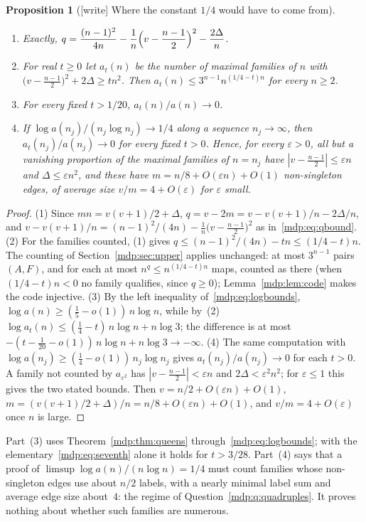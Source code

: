 \documentclass[11pt,letterpaper]{article}
\numberwithin{equation}{section}
\newtheorem{proposition}[theorem]{Proposition}
\theoremstyle{remark}\newtheorem{remark}[theorem]{Remark}
\begin{document}
\begin{proposition}[{[write]} Where the constant $1/4$ would have to come from]\label{mdp:prop:typical}
\begin{enumerate}
\item[(1)] Exactly,
 $q=\dfrac{(n-1)^2}{4n}-\dfrac1n\Bigl(v-\dfrac{n-1}2\Bigr)^2-\dfrac{2\Delta}n$.
\item[(2)] For real $t\ge0$ let $a_t(n)$ be the number of maximal families of
 $n$ with $\bigl(v-\tfrac{n-1}2\bigr)^2+2\Delta\ge tn^2$. Then
 $a_t(n)\le3^{n-1}n^{(1/4-t)n}$ for every $n\ge2$.
\item[(3)] For every fixed $t>1/20$, $a_t(n)/a(n)\to0$.
\item[(4)] If $\log a(n_j)/(n_j\log n_j)\to1/4$ along a sequence
 $n_j\to\infty$, then $a_t(n_j)/a(n_j)\to0$ for every fixed $t>0$. Hence,
 for every $\varepsilon>0$, all but a vanishing proportion of the maximal
 families of $n=n_j$ have $|v-\frac{n-1}2|\le\varepsilon n$ and
 $\Delta\le\varepsilon n^2$, and these have
 $m=n/8+O(\varepsilon n)+O(1)$ non-singleton edges, of average size
 $v/m=4+O(\varepsilon)$ for $\varepsilon$ small.
\end{enumerate}
\end{proposition}
\begin{proof}
(1) Since $mn=v(v+1)/2+\Delta$, $q=v-2m=v-v(v+1)/n-2\Delta/n$, and
$v-v(v+1)/n=(n-1)^2/(4n)-\frac1n\bigl(v-\frac{n-1}2\bigr)^2$ as
in~\eqref{mdp:eq:qbound}. (2) For the families counted, (1) gives
$q\le(n-1)^2/(4n)-tn\le(1/4-t)n$. The counting of Section~\ref{mdp:sec:upper}
applies unchanged: at most $3^{n-1}$ pairs $(A,F)$, and for each at most
$n^q\le n^{(1/4-t)n}$ maps, counted as there (when $(1/4-t)n<0$ no family qualifies,
since $q\ge0$); Lemma~\ref{mdp:lem:code} makes the code injective. (3) By
the left inequality of~\eqref{mdp:eq:logbounds},
$\log a(n)\ge(\tfrac15-o(1))\,n\log n$, while by~(2)
$\log a_t(n)\le(\tfrac14-t)\,n\log n+n\log3$; the difference is at most
$-(t-\tfrac1{20}-o(1))\,n\log n+n\log3\to-\infty$. (4) The same computation
with $\log a(n_j)\ge(\tfrac14-o(1))\,n_j\log n_j$ gives $a_t(n_j)/a(n_j)\to0$
for each $t>0$. A family not counted by $a_{\varepsilon^2}$ has
$|v-\frac{n-1}2|<\varepsilon n$ and $2\Delta<\varepsilon^2n^2$; for $\varepsilon\le1$
this gives the two stated bounds. Then $v=n/2+O(\varepsilon n)+O(1)$,
$m=(v(v+1)/2+\Delta)/n=n/8+O(\varepsilon n)+O(1)$, and $v/m=4+O(\varepsilon)$
once $n$ is large.
\end{proof}
Part~(3) uses Theorem~\ref{mdp:thm:queens} through~\eqref{mdp:eq:logbounds};
with the elementary~\eqref{mdp:eq:seventh} alone it holds for $t>3/28$.
Part~(4) says that a proof of $\limsup\log a(n)/(n\log n)=1/4$ must count
families whose non-singleton edges use about $n/2$ labels, with a nearly
minimal label sum and average edge size about~$4$: the regime of
Question~\ref{mdp:q:quadruples}. It proves nothing about whether such
families are numerous.
\end{document}
